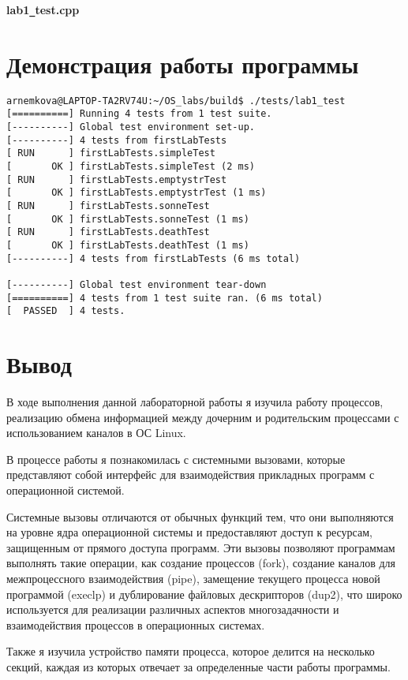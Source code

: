 \documentclass[a4paper, 14pt]{article}
\begin{document}
\textbf{lab1\texttt{\_}test.cpp}


\section*{Демонстрация работы программы}
\begin{verbatim}
arnemkova@LAPTOP-TA2RV74U:~/OS_labs/build$ ./tests/lab1_test
[==========] Running 4 tests from 1 test suite.
[----------] Global test environment set-up.
[----------] 4 tests from firstLabTests
[ RUN      ] firstLabTests.simpleTest
[       OK ] firstLabTests.simpleTest (2 ms)
[ RUN      ] firstLabTests.emptystrTest
[       OK ] firstLabTests.emptystrTest (1 ms)
[ RUN      ] firstLabTests.sonneTest
[       OK ] firstLabTests.sonneTest (1 ms)
[ RUN      ] firstLabTests.deathTest
[       OK ] firstLabTests.deathTest (1 ms)
[----------] 4 tests from firstLabTests (6 ms total)

[----------] Global test environment tear-down
[==========] 4 tests from 1 test suite ran. (6 ms total)
[  PASSED  ] 4 tests.
\end{verbatim}

\section*{Вывод}

В ходе выполнения данной лабораторной работы я изучила работу процессов, реализацию обмена информацией между дочерним и родительским процессами с использованием каналов в ОС Linux.

В процессе работы я познакомилась с системными вызовами, которые представляют собой интерфейс для взаимодействия прикладных программ с операционной системой.

Системные вызовы отличаются от обычных функций тем, что они выполняются на уровне ядра операционной системы и предоставляют доступ к ресурсам, защищенным от прямого доступа программ. Эти вызовы позволяют программам выполнять такие операции, как создание процессов (fork), создание каналов для межпроцессного взаимодействия (pipe), замещение текущего процесса новой программой (execlp) и дублирование файловых дескрипторов (dup2), что широко используется для реализации различных аспектов многозадачности и взаимодействия процессов в операционных системах.

Также я изучила устройство памяти процесса, которое делится на несколько секций, каждая из которых отвечает за определенные части работы программы.
\end{document}

